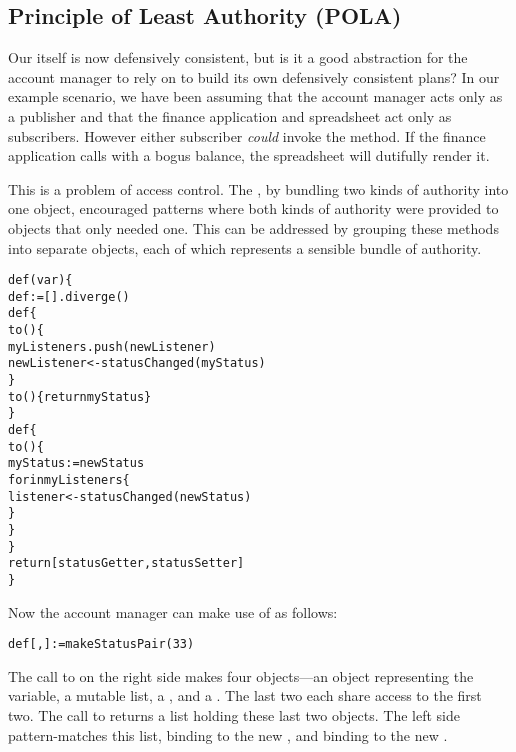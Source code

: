 \documentclass{llncs}
\begin{document}
\subsection{Principle of Least Authority (POLA)}

Our  itself is now defensively consistent, but is
it a good abstraction for the account manager to rely on to build its
own defensively consistent plans? In our example scenario, we have
been assuming that the account manager acts only as a publisher and
that the finance application and spreadsheet act only as
subscribers. However either subscriber \emph{could} invoke the
 method. If the finance application calls
 with a bogus balance, the spreadsheet will dutifully
render it.

This is a problem of access control. The , by
bundling two kinds of authority into one object, encouraged patterns
where both kinds of authority were provided to objects that only
needed one. This can be addressed by grouping these methods into
separate objects, each of which represents a sensible bundle of
authority.
%
\begin{alltt}
    def (var ) \{
        def  := [].diverge()
        def  \{
            to () \{
                myListeners.push(newListener)
                newListener <- statusChanged(myStatus)
            \}
            to () \{ return myStatus \}
        \}
        def  \{
            to () \{
                myStatus := newStatus
                for  in myListeners \{
                    listener <- statusChanged(newStatus)
                \}
            \}
        \}
        return [statusGetter, statusSetter]
    \}
\end{alltt}
%
Now the account manager can make use of  as
follows:
%
\begin{alltt}
    def [, ] := makeStatusPair(33)
\end{alltt}
%
The call to  on the right side makes four
objects---an object representing the  variable, a
mutable  list, a , and a
. The last two each share access to the first
two. The call to  returns a list holding these
last two objects. The left side pattern-matches this list, binding
 to the new , and binding 
to the new .
\end{document}
